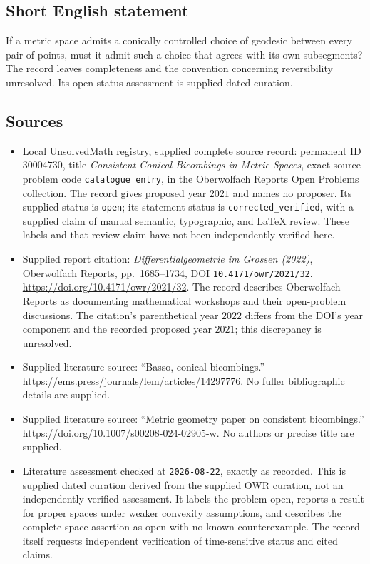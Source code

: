 \documentclass[11pt]{article}
\begin{document}
\subsection{Short English statement}
If a metric space admits a conically controlled choice of geodesic between every pair of points, must it admit such a choice that agrees with its own subsegments? The record leaves completeness and the convention concerning reversibility unresolved. Its open-status assessment is supplied dated curation.
\subsection{Sources}
\begin{itemize}
\item Local UnsolvedMath registry, supplied complete source record: permanent ID \(30004730\), title \emph{Consistent Conical Bicombings in Metric Spaces}, exact source problem code \texttt{catalogue entry}, in the Oberwolfach Reports Open Problems collection. The record gives proposed year \(2021\) and names no proposer. Its supplied status is \texttt{open}; its statement status is \texttt{corrected\_verified}, with a supplied claim of manual semantic, typographic, and LaTeX review. These labels and that review claim have not been independently verified here.
\item Supplied report citation: \emph{Differentialgeometrie im Grossen (2022)}, Oberwolfach Reports, pp.\ 1685--1734, DOI \texttt{10.4171/owr/2021/32}. \url{https://doi.org/10.4171/owr/2021/32}. The record describes Oberwolfach Reports as documenting mathematical workshops and their open-problem discussions. The citation's parenthetical year \(2022\) differs from the DOI's year component and the recorded proposed year \(2021\); this discrepancy is unresolved.
\item Supplied literature source: ``Basso, conical bicombings.'' \url{https://ems.press/journals/lem/articles/14297776}. No fuller bibliographic details are supplied.
\item Supplied literature source: ``Metric geometry paper on consistent bicombings.'' \url{https://doi.org/10.1007/s00208-024-02905-w}. No authors or precise title are supplied.
\item Literature assessment checked at \texttt{2026-08-22}, exactly as recorded. This is supplied dated curation derived from the supplied OWR curation, not an independently verified assessment. It labels the problem open, reports a result for proper spaces under weaker convexity assumptions, and describes the complete-space assertion as open with no known counterexample. The record itself requests independent verification of time-sensitive status and cited claims.
\end{itemize}
\end{document}
